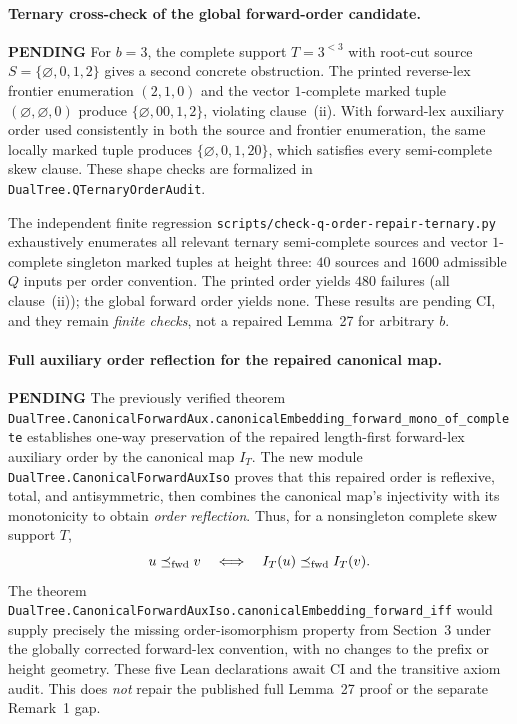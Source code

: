 \documentclass[11pt]{article}
\newcommand{\todo}{\textcolor{gray!70!black}{\textbf{PENDING}}}
\newcommand{\lean}[1]{\texttt{#1}}
\begin{document}
\paragraph{Ternary cross-check of the global forward-order candidate.} \todo
For $b=3$, the complete support $T=3^{<3}$
with root-cut source $S=\{\varnothing,0,1,2\}$
gives a second concrete obstruction. The printed
reverse-lex frontier enumeration $(2,1,0)$ and
the vector $1$-complete marked tuple
$(\varnothing,\varnothing,0)$ produce
$\{\varnothing,00,1,2\}$, violating clause~(ii).
With forward-lex auxiliary order used consistently
in both the source and frontier enumeration, the
same locally marked tuple produces
$\{\varnothing,0,1,20\}$, which satisfies every
semi-complete skew clause. These shape checks are
formalized in
\lean{DualTree.QTernaryOrderAudit}.

The independent finite regression
\texttt{scripts/check-q-order-repair-ternary.py}
exhaustively enumerates all relevant ternary
semi-complete sources and vector $1$-complete
singleton marked tuples at height three:
$40$ sources and $1600$ admissible $Q$ inputs
per order convention. The printed order yields
$480$ failures (all clause~(ii)); the global
forward order yields none. These results are
pending CI, and they remain \emph{finite checks},
not a repaired Lemma~27 for arbitrary $b$.

\paragraph{Full auxiliary order reflection for the repaired canonical map.} \todo
The previously verified theorem
\lean{DualTree.CanonicalForwardAux.canonicalEmbedding_forward_mono_of_complete}
establishes one-way preservation of the repaired
length-first forward-lex auxiliary order by the
canonical map $I_T$.
The new module \lean{DualTree.CanonicalForwardAuxIso}
proves that this repaired order is reflexive,
total, and antisymmetric, then combines the
canonical map's injectivity with its monotonicity
to obtain \emph{order reflection}. Thus, for
a nonsingleton complete skew support $T$,
\[
 u\preceq_{\rm fwd}v
 \quad\Longleftrightarrow\quad
 I_T(u)\preceq_{\rm fwd} I_T(v).
\]
The theorem
\lean{DualTree.CanonicalForwardAuxIso.canonicalEmbedding_forward_iff}
would supply precisely the missing order-isomorphism
property from Section~3 under the globally corrected
forward-lex convention, with no changes to the
prefix or height geometry. These five Lean
declarations await CI and the transitive axiom
audit. This does \emph{not} repair the published
full Lemma~27 proof or the separate Remark~1 gap.
\end{document}
